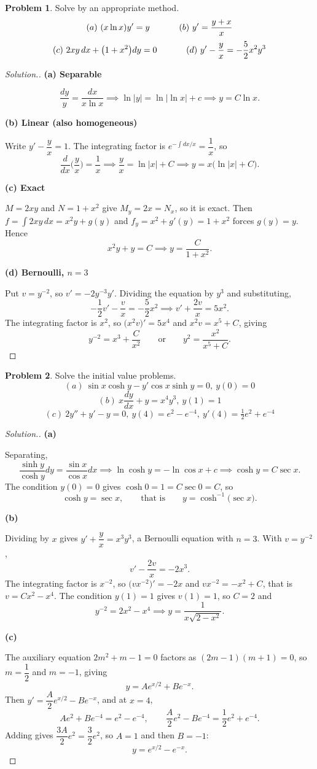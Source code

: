 \documentclass[11pt,a4paper]{article}
\theoremstyle{definition}
\newtheorem{problemx}{Problem}[subsection]
\newenvironment{problem}{\begin{problemx}}{\end{problemx}}
\newenvironment{solution}
  {\renewcommand{\qedsymbol}{}\begin{proof}[\textit{Solution}.]}
  {\end{proof}}
\newcommand{\subhead}[1]{%
  \par\medskip\noindent\textbf{#1}\par\nobreak\smallskip}
\begin{document}
\begin{problem}
Solve by an appropriate method.
$$(a)\ (x\ln x)y' = y\hspace{1.2cm}(b)\ y' = \frac{y+x}{x}$$
$$(c)\ 2xy\,dx + \big(1+x^2\big)dy = 0\hspace{1.2cm}
(d)\ y' - \frac{y}{x} = -\frac52x^2y^3$$
\end{problem}
\begin{solution}
\subhead{(a) Separable}
$$\frac{dy}{y} = \frac{dx}{x\ln x}
\implies \ln\left|y\right| = \ln\left|\ln x\right| + c
\implies y = C\ln x .$$

\subhead{(b) Linear (also homogeneous)}
Write $y' - \dfrac{y}{x} = 1$. The integrating factor is
$e^{-\int dx/x} = \dfrac1x$, so
$$\frac{d}{dx}\Big(\frac yx\Big) = \frac1x
\implies \frac yx = \ln\left|x\right| + C
\implies y = x\big(\ln\left|x\right| + C\big).$$

\subhead{(c) Exact}
$M = 2xy$ and $N = 1+x^2$ give $M_y = 2x = N_x$, so it is exact. Then
$f = \displaystyle\int 2xy\,dx = x^2y + g(y)$ and
$f_y = x^2+g'(y) = 1+x^2$ forces $g(y) = y$. Hence
$$x^2y + y = C \implies y = \frac{C}{1+x^2}.$$

\subhead{(d) Bernoulli, $n=3$}
Put $v = y^{-2}$, so $v' = -2y^{-3}y'$. Dividing the equation by $y^3$ and
substituting,
$$-\frac12v' - \frac{v}{x} = -\frac52x^2
\implies v' + \frac{2v}{x} = 5x^2 .$$
The integrating factor is $x^2$, so
$\big(x^2v\big)' = 5x^4$ and $x^2v = x^5 + C$, giving
$$y^{-2} = x^3 + \frac{C}{x^2}
\qquad\text{or}\qquad y^2 = \frac{x^2}{x^5+C}.$$
\end{solution}

\begin{problem}
Solve the initial value problems.
$$(a)\ \sin x\cosh y - y'\cos x\sinh y = 0,\ y(0) = 0$$
$$(b)\ x\frac{dy}{dx} + y = x^4y^3,\ y(1) = 1$$
$$(c)\ 2y''+y'-y = 0,\ y(4) = e^2-e^{-4},\ y'(4) = \tfrac12e^2+e^{-4}$$
\end{problem}
\begin{solution}
\subhead{(a)}
Separating,
$$\frac{\sinh y}{\cosh y}dy = \frac{\sin x}{\cos x}dx
\implies \ln\cosh y = -\ln\cos x + c
\implies \cosh y = C\sec x .$$
The condition $y(0) = 0$ gives $\cosh 0 = 1 = C\sec 0 = C$, so
$$\cosh y = \sec x, \qquad\text{that is}\qquad y = \cosh^{-1}\big(\sec x\big).$$

\subhead{(b)}
Dividing by $x$ gives $y' + \dfrac yx = x^3y^3$, a Bernoulli equation with
$n=3$. With $v = y^{-2}$,
$$v' - \frac{2v}{x} = -2x^3 .$$
The integrating factor is $x^{-2}$, so
$\big(vx^{-2}\big)' = -2x$ and $vx^{-2} = -x^2 + C$, that is
$v = Cx^2 - x^4$. The condition $y(1)=1$ gives $v(1) = 1$, so $C = 2$ and
$$y^{-2} = 2x^2 - x^4
\implies y = \frac{1}{x\sqrt{2-x^2}} .$$

\subhead{(c)}
The auxiliary equation $2m^2+m-1 = 0$ factors as $(2m-1)(m+1) = 0$, so
$m = \dfrac12$ and $m = -1$, giving
$$y = Ae^{x/2} + Be^{-x} .$$
Then $y' = \dfrac A2e^{x/2} - Be^{-x}$, and at $x=4$,
$$Ae^2 + Be^{-4} = e^2 - e^{-4},\qquad
\frac A2e^2 - Be^{-4} = \frac12e^2 + e^{-4}.$$
Adding gives $\dfrac{3A}{2}e^2 = \dfrac32e^2$, so $A = 1$ and then $B = -1$:
$$y = e^{x/2} - e^{-x}.$$
\end{solution}
\end{document}
